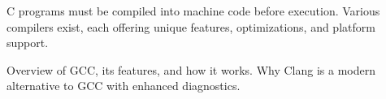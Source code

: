 \begin{NxSSBox}[breakable][Compilers]
	\begin{NxIDBox}
		C programs must be compiled into machine code before execution. Various compilers exist, each offering unique features, optimizations, and platform support.
	\end{NxIDBox}
	\begin{NxIDBoxL}
		 Overview of GCC, its features, and how it works.
		 Why Clang is a modern alternative to GCC with enhanced diagnostics.
	\end{NxIDBoxL}
\end{NxSSBox}




